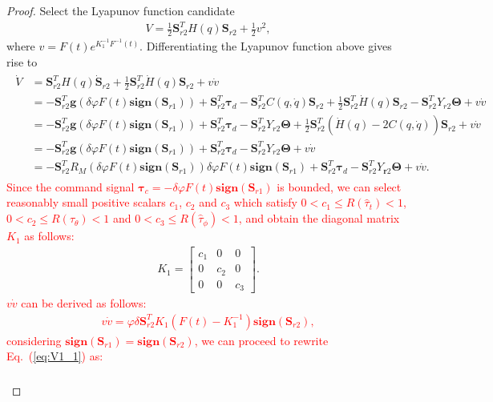 \documentclass[3p]{elsarticle}
\theoremstyle{plain}
\theoremstyle{remark}
\begin{document}
\begin{proof}
Select the Lyapunov function candidate
\begin{align}
V=\frac{1}{2}\bm S_{r2}^TH(q)\bm S_{r2}+\frac{1}{2}v^2,
\end{align}
where $v=F(t)e^{K_1^{-1}F^{-1}(t)}$. Differentiating the Lyapunov function above gives rise to
\begin{align}
\begin{split}
\dot V &= \bm S_{r2}^TH(q)\dot {\bm S}_{r2}+\frac{1}{2}\bm S_{r2}^T\dot H(q)\bm S_{r2}+v\dot v\\
&= -\bm S_{r2}^T\bm{g}(\delta\varphi F(t) \bm{sign}(\bm S_{r1}))+\bm S_{r2}^T\bm\tau_d-\bm S_{r2}^TC(q,\dot q)\bm S_{r2}+\frac{1}{2}\bm S_{r2}^T\dot H(q)\bm S_{r2}-\bm S_{r2}^TY_{r2}\bm\Theta+v\dot v\\
&= -\bm S_{r2}^T\bm{g}(\delta\varphi F(t) \bm{sign}(\bm S_{r1}))+\bm S_{r2}^T\bm\tau_d-\bm S_{r2}^TY_{r2}\bm\Theta+\frac{1}{2}\bm S_{r2}^T(\dot H(q)-2C(q,\dot q))\bm S_{r2}+v\dot v\\
&= -\bm S_{r2}^T\bm{g}(\delta\varphi F(t) \bm{sign}(\bm S_{r1}))+\bm S_{r2}^T\bm\tau_d-\bm S_{r2}^TY_{r2}\bm\Theta+v\dot v\\
&= -\bm S_{r2}^TR_M(\delta\varphi F(t) \bm{sign}(\bm S_{r1}))\delta\varphi F(t) \bm{sign}(\bm S_{r1})+\bm S_{r2}^T\bm\tau_d-\bm S_{r2}^TY_{\bm r2}\bm\Theta+v\dot v.\label{eq:V1_1}
\end{split}
\end{align}
\textcolor{red}{Since the command signal $ \bm\tau_c=-\delta\varphi F(t) \bm {sign}(\bm{S}_{r1})$ is bounded, we can select reasonably small positive scalars $c_1$, $c_2$ and $c_3$ which satisfy $0<c_1\le R(\hat\tau_t)<1$, $0<c_2\le R(\hat\tau_\theta)<1$ and $0<c_3\le R(\hat\tau_\phi)<1$, and obtain the diagonal matrix $K_1$ as follows:}
\begin{align}
K_1 = \begin{bmatrix}c_1&0&0\\0&c_2&0\\0&0&c_3\end{bmatrix}.\label{eq:saturated ratio}
\end{align}
\textcolor{red}{$v\dot v$ can be derived as follows:
\begin{align}
v\dot v =\varphi\delta \bm S_{r2}^T K_1(F(t)-K_1^{-1})\bm{sign}(\bm S_{r2}),
\end{align}
considering $\bm{sign}(\bm S_{r1})=\bm{sign}(\bm S_{r2})$, we can proceed to rewrite Eq.~(\ref{eq:V1_1}) as:
\begin{align}
\begin{split}\label{eq:V1_2}

\end{split}
\end{align}}
\end{proof}
\end{document}
